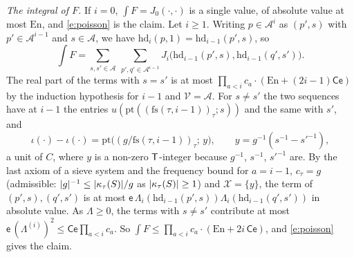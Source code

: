 \documentclass[11pt,a4paper]{article}
\makeatletter
\theoremstyle{plainx}
\theoremstyle{uprightx}
\renewenvironment{proof}[1][Proof]{\par\pushQED{\qed}\normalfont\topsep0pt\partopsep0pt
  \trivlist\item[\hskip\labelsep\itshape #1.]\ignorespaces}{\popQED\endtrivlist\@endpefalse}
\makeatother
\begin{document}
\begin{proof}[Proof of Theorem C]
\emph{The integral of $F$.} If $i=0$, $\int F=J_0(\cdot,\cdot)$ is a single value, of absolute value at most
$\mathrm{En}$, and \eqref{e:poisson} is the claim. Let $i\ge1$. Writing $p\in\mathcal{A}^{i}$ as $(p',s)$ with
$p'\in\mathcal{A}^{i-1}$ and $s\in\mathcal{A}$, we have $\mathrm{hd}_i(p,1)=\mathrm{hd}_{i-1}(p',s)$, so
\[\int F=\sum_{s,s'\in\mathcal{A}}\ \sum_{p',q'\in\mathcal{A}^{i-1}}J_i\bigl(\mathrm{hd}_{i-1}(p',s),\mathrm{hd}_{i-1}(q',s')\bigr).\]
The real part of the terms with $s=s'$ is at most $\prod_{a<i}c_a\cdot(\mathrm{En}+(2i-1)\mathsf{C}\mathsf{e})$ by the
induction hypothesis for $i-1$ and $\mathcal{V}=\mathcal{A}$. For $s\ne s'$ the two sequences have at $i-1$ the entries
$u(\mathrm{pt}((\mathrm{fs}(\tau,i-1))_\tau;s))$ and the same with $s'$, and
\[\iota(\cdot)-\iota(\cdot)=\mathrm{pt}\bigl((g/\mathrm{fs}(\tau,i-1))_\tau;\,y\bigr),\qquad y=g^{-1}(s^{-1}-s'^{-1}),\]
a unit of $C$, where $y$ is a non-zero $\mathsf{T}$-integer because $g^{-1}$, $s^{-1}$, $s'^{-1}$ are. By the last axiom of
a sieve system and the frequency bound for $a=i-1$, $c_\tau=g$ (admissible: $|g|^{-1}\le|\kappa_{\tau}(S)|/g$ as
$|\kappa_{\tau}(S)|\ge1$) and $\mathcal{X}=\{y\}$, the term of $(p',s),(q',s')$ is at most
$\mathsf{e}\,\Lambda_i(\mathrm{hd}_{i-1}(p',s))\Lambda_i(\mathrm{hd}_{i-1}(q',s'))$ in absolute value. As
$\Lambda\ge0$, the terms with $s\ne s'$ contribute at most $\mathsf{e}\,(\Lambda^{(i)})^{2}\le\mathsf{C}\mathsf{e}\prod_{a<i}c_a$.
So $\int F\le\prod_{a<i}c_a\cdot(\mathrm{En}+2i\,\mathsf{C}\mathsf{e})$, and \eqref{e:poisson} gives the claim.
\end{proof}
\end{document}
